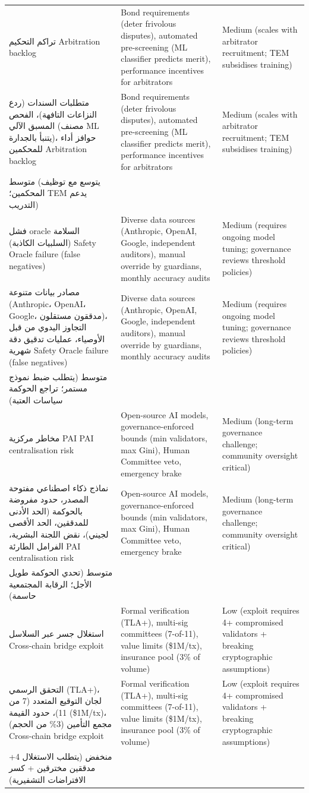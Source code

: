 \documentclass[11pt]{article}
\begin{document}
\begin{longtable}{@{}p{}p{}p{}@{}}
تراكم التحكيم Arbitration backlog & Bond requirements (deter frivolous disputes), automated pre-screening (ML classifier predicts merit), performance incentives for arbitrators & Medium (scales with arbitrator recruitment; TEM subsidises training) \\ متطلبات السندات (ردع النزاعات التافهة)، الفحص المسبق الآلي (مصنف ML يتنبأ بالجدارة)، حوافز أداء للمحكمين Arbitration backlog & Bond requirements (deter frivolous disputes), automated pre-screening (ML classifier predicts merit), performance incentives for arbitrators & Medium (scales with arbitrator recruitment; TEM subsidises training) \\ متوسط (يتوسع مع توظيف المحكمين؛ TEM يدعم التدريب) \\
فشل oracle السلامة (السلبيات الكاذبة) Safety Oracle failure (false negatives) & Diverse data sources (Anthropic, OpenAI, Google, independent auditors), manual override by guardians, monthly accuracy audits & Medium (requires ongoing model tuning; governance reviews threshold policies) \\ مصادر بيانات متنوعة (Anthropic، OpenAI، Google، مدققون مستقلون)، التجاوز اليدوي من قبل الأوصياء، عمليات تدقيق دقة شهرية Safety Oracle failure (false negatives) & Diverse data sources (Anthropic, OpenAI, Google, independent auditors), manual override by guardians, monthly accuracy audits & Medium (requires ongoing model tuning; governance reviews threshold policies) \\ متوسط (يتطلب ضبط نموذج مستمر؛ تراجع الحوكمة سياسات العتبة) \\
مخاطر مركزية PAI PAI centralisation risk & Open-source AI models, governance-enforced bounds (min validators, max Gini), Human Committee veto, emergency brake & Medium (long-term governance challenge; community oversight critical) \\ نماذج ذكاء اصطناعي مفتوحة المصدر، حدود مفروضة بالحوكمة (الحد الأدنى للمدققين، الحد الأقصى لجيني)، نقض اللجنة البشرية، الفرامل الطارئة PAI centralisation risk & Open-source AI models, governance-enforced bounds (min validators, max Gini), Human Committee veto, emergency brake & Medium (long-term governance challenge; community oversight critical) \\ متوسط (تحدي الحوكمة طويل الأجل؛ الرقابة المجتمعية حاسمة) \\
استغلال جسر عبر السلاسل Cross-chain bridge exploit & Formal verification (TLA+), multi-sig committees (7-of-11), value limits (\$1M/tx), insurance pool (3\% of volume) & Low (exploit requires 4+ compromised validators + breaking cryptographic assumptions) \\\bottomrule التحقق الرسمي (TLA+)، لجان التوقيع المتعدد (7 من 11)، حدود القيمة (\$1M/tx)، مجمع التأمين (3\% من الحجم) Cross-chain bridge exploit & Formal verification (TLA+), multi-sig committees (7-of-11), value limits (\$1M/tx), insurance pool (3\% of volume) & Low (exploit requires 4+ compromised validators + breaking cryptographic assumptions) \\\bottomrule منخفض (يتطلب الاستغلال 4+ مدققين مخترقين + كسر الافتراضات التشفيرية) \\\bottomrule

\end{longtable}
\end{document}
